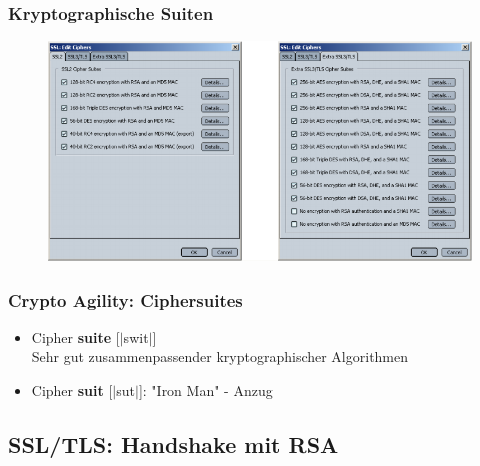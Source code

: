 \documentclass[openany]{book}
\begin{document}
\newpage

\subsubsection{Kryptographische Suiten}

\begin{figure}[h!]
    \centering
    \includegraphics[width=\linewidth]{Pics/SecuritySuites.PNG}
\end{figure}

\subsubsection{Crypto Agility: Ciphersuites}

\begin{itemize}
    \item Cipher \textbf{suite} [$|$swit$|$] \\ Sehr gut zusammenpassender kryptographischer Algorithmen
    \item Cipher \textbf{suit} [$|$sut$|$]: "Iron Man" - Anzug
\end{itemize}

\subsection{SSL/TLS: Handshake mit RSA}
\end{document}

